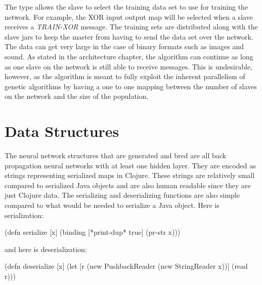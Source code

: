 The type allows the slave to select the training data set to use for training the network. 
For example, the XOR input output map will be selected when a slave receives a {\em TRAIN-XOR} message. 
The training sets are distributed along with the slave jars to keep the master from having to send the data set over the network. 
The data can get very large in the case of binary formats such as images and sound. 
As stated in the architecture chapter, the algorithm can continue as long as one slave on the network is still able to receive messages. 
This is undesirable, however, as the algorithm is meant to fully exploit the inherent parallelism of genetic algorithms by having a one to one mapping between the number of slaves on the network and the size of the population. 

\section{Data Structures}
The neural network structures that are generated and bred are all back propagation neural networks with at least one hidden layer. They are encoded as strings representing serialized maps in Clojure. These strings are relatively small compared to serialized Java objects and are also human readable since they are just Clojure data. The serializing and deserializing functions are also simple compared to what would be needed to serialize a Java object. Here is serialization: 

(defn serialize [x]
  (binding [*print-dup* true] (pr-str x)))

and here is deserialization:

(defn deserialize [x]
  (let [r (new PushbackReader (new StringReader x))]
    (read r)))


